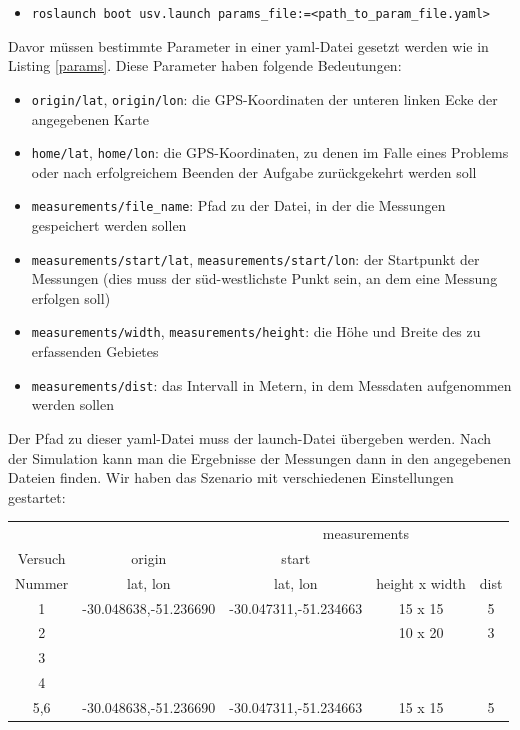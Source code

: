 \documentclass[11pt]{article}
\begin{document}
\begin{itemize} \label{launch}
	\item \texttt{roslaunch boot usv.launch params\_file:=<path\_to\_param\_file.yaml>}
\end{itemize}



Davor müssen bestimmte Parameter in einer yaml-Datei gesetzt werden wie in Listing \ref{params}. Diese Parameter haben folgende Bedeutungen:
\begin{itemize}
	\item \texttt{origin/lat}, \texttt{origin/lon}: die GPS-Koordinaten der unteren linken Ecke der angegebenen Karte
	\item \texttt{home/lat}, \texttt{home/lon}: die GPS-Koordinaten, zu denen im Falle eines Problems oder nach erfolgreichem Beenden der Aufgabe zurückgekehrt werden soll
	\item \texttt{measurements/file\_name}: Pfad zu der Datei, in der die Messungen gespeichert werden sollen
	\item \texttt{measurements/start/lat}, \texttt{measurements/start/lon}: der Startpunkt der Messungen (dies muss der süd-westlichste Punkt sein, an dem eine Messung erfolgen soll)
	\item \texttt{measurements/width}, \texttt{measurements/height}: die Höhe und Breite des zu erfassenden Gebietes
	\item \texttt{measurements/dist}: das Intervall in Metern, in dem Messdaten aufgenommen werden sollen
\end{itemize}
Der Pfad zu dieser yaml-Datei muss der launch-Datei übergeben werden. Nach der Simulation kann man die Ergebnisse der Messungen dann in den angegebenen Dateien finden.
Wir haben das Szenario mit verschiedenen Einstellungen gestartet:

\begin{center}
\begin{tabular}[t]{|c|c| c| c| c|}
	\hline
	& & \multicolumn{3}{c|}{measurements}\\
	Versuch&origin&start& & \\
	Nummer&lat, lon & lat, lon & height x width & dist\\
	\hline
	1&-30.048638,-51.236690&-30.047311,-51.234663&15 x 15&5\\
	\hline
	2&&&10 x 20&3\\
	\hline
	3&&& \\
	\hline
	4&&& \\
	\hline
	5,6&-30.048638,-51.236690&-30.047311,-51.234663&15 x 15&5\\
	\hline
\end{tabular}
\end{center}
\end{document}
